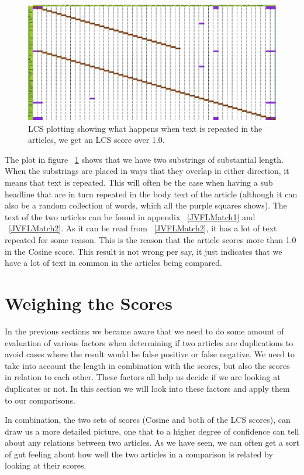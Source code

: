 \begin{figure}
	\centering
	\includegraphics[scale=0.35]{figures/Over}
	\caption{LCS plotting showing what happens when text is repeated in the articles, we get an LCS score over 1.0.}
	\label{Over100}
\end{figure}

The plot in figure ~\ref{Over100} shows that we have two substrings of substantial length. When the substrings are placed in ways that they overlap in either direction, it means that text is repeated. This will often be the case when having a sub headline that are in turn repeated in the body text of the article (although it can also be a random collection of words, which all the purple squares shows). The text of the two articles can be found in appendix ~\ref{JVFLMatch1} and ~\ref{JVFLMatch2}. As it can be read from ~\ref{JVFLMatch2}, it has a lot of text repeated for some reason. This is the reason that the article scores more than 1.0 in the Cosine score. This result is not wrong per say, it just indicates that we have a lot of text in common in the articles being compared.

\section{Weighing the Scores}
In the previous sections we became aware that we need to do some amount of evaluation of various factors when determining if two articles are duplications to avoid cases where the result would be false positive or false negative. We need to take into account the length in combination with the scores, but also the scores in relation to each other. These factors all help us decide if we are looking at duplicates or not. In this section we will look into these factors and apply them to our comparisons.

In combination, the two sets of scores (Cosine and both of the LCS scores), can draw us a more detailed picture, one that to a higher degree of confidence can tell about any relations between two articles. As we have seen, we can often get a sort of gut feeling about how well the two articles in a comparison is related by looking at their scores.

